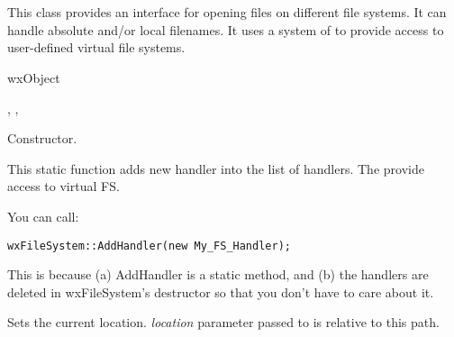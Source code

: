 %
%

\section{}\label{wxfilesystem}

This class provides an interface for opening files on different
file systems. It can handle absolute and/or local filenames.
It uses a system of  to
provide access to user-defined virtual file systems.


wxObject


, 
, 


\label{wxfilesystemwxfilesystem}


Constructor. 

\label{wxfilesystemaddhandler}


This static function adds new handler into the list of handlers.
The  provide access to virtual FS.


You can call:

\begin{verbatim}
wxFileSystem::AddHandler(new My_FS_Handler);
\end{verbatim}

This is because (a) AddHandler is a static method, and (b) the handlers
are deleted in wxFileSystem's destructor so that you don't have to
care about it.

\label{wxfilesystemchangepathto}


Sets the current location. {\it location} parameter passed to 
 is relative to this path.

